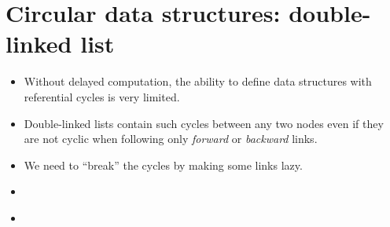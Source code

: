 \documentclass{beamer}
\newcommand{\tmem}[1]{{\em #1\/}}
\begin{document}

\section{Circular data structures: double-linked list}

\begin{itemize}
  \item Without delayed computation, the ability to define data structures
  with referential cycles is very limited.
  
  \item Double-linked lists contain such cycles between any two nodes even if
  they are not cyclic when following only {\tmem{forward}} or
  {\tmem{backward}} links.
  
  
  \item We need to ``break'' the cycles by making some links lazy.
  
  \item {}{}{\hlopt{=}}{\hlendline{}}\\
  {\hlstd{ \ }}{}{\hlopt{\textbar }}{}{}{}{}{}{}{\hlopt{*
  }}{}{\hlopt{* }}{}{\hlendline{}}
  
  \item {}{}{\hlopt{=}}{\hlendline{}}\\
  {\hlstd{ \ }}{}{}{}{\hlendline{}}\\
  {\hlstd{ \ \ \ }}{\hlopt{\textbar }}{}{\hlopt{(}}{\hlstd{{\textunderscore}}}{\hlopt{, }}{}{\hlopt{,
  }}{}{\hlopt{) }}{}{}{\hlopt{>}}{}{\hlopt{->}}{\hlendline{}}\\
  {}{\hlopt{(}}{}{\hlopt{-}}{}{\hlopt{)
  }}{}{\hlopt{->
  }}{}{\hlendline{}}
  

\end{itemize}
\end{document}
